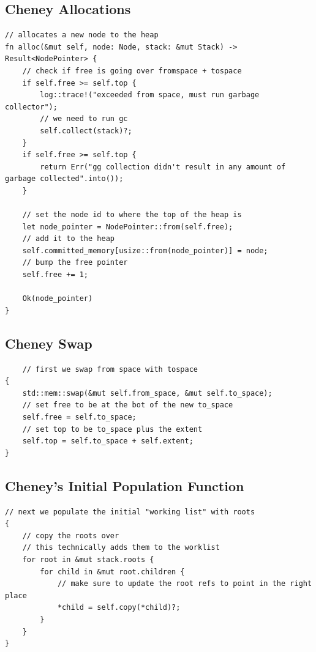 \documentclass[index]{subfiles}
\begin{document}
\subsection{Cheney Allocations}
\begin{verbatim}
// allocates a new node to the heap
fn alloc(&mut self, node: Node, stack: &mut Stack) -> Result<NodePointer> {
    // check if free is going over fromspace + tospace
    if self.free >= self.top {
        log::trace!("exceeded from space, must run garbage collector");
        // we need to run gc
        self.collect(stack)?;
    }
    if self.free >= self.top {
        return Err("gg collection didn't result in any amount of garbage collected".into());
    }

    // set the node id to where the top of the heap is
    let node_pointer = NodePointer::from(self.free);
    // add it to the heap
    self.committed_memory[usize::from(node_pointer)] = node;
    // bump the free pointer
    self.free += 1;

    Ok(node_pointer)
}
\end{verbatim}
\subsection{Cheney Swap}
\begin{verbatim}
    // first we swap from space with tospace
{
    std::mem::swap(&mut self.from_space, &mut self.to_space);
    // set free to be at the bot of the new to_space
    self.free = self.to_space;
    // set top to be to_space plus the extent
    self.top = self.to_space + self.extent;
}
\end{verbatim}
\subsection{Cheney's Initial Population Function}
\begin{verbatim}
// next we populate the initial "working list" with roots
{
    // copy the roots over
    // this technically adds them to the worklist
    for root in &mut stack.roots {
        for child in &mut root.children {
            // make sure to update the root refs to point in the right place
            *child = self.copy(*child)?;
        }
    }
}
\end{verbatim}
\end{document}
